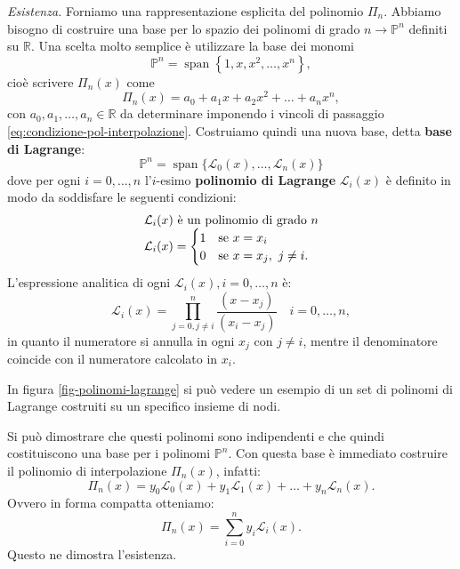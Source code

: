 \textit{Esistenza.} Forniamo una rappresentazione esplicita del polinomio $\Pi _{n}$. Abbiamo bisogno di costruire una base per lo spazio dei polinomi di grado $n\rightarrow \mathbb{P}^{n}$ definiti su $\mathbb{R}$. Una scelta molto semplice è utilizzare la base dei monomi
\begin{equation*}
\mathbb{P}^{n} =\operatorname{span}\left\{1,x,x^{2} ,\dotsc ,x^{n}\right\} ,
\end{equation*}
cioè scrivere $\Pi _{n}(x)$ come
\begin{equation*}
\Pi _{n}(x) =a_{0} +a_{1} x+a_{2} x^{2} +\dotsc +a_{n} x^{n} ,
\end{equation*}
con $a_{0} ,a_{1} ,\dotsc ,a_{n} \in \mathbb{R}$ da determinare imponendo i vincoli di passaggio \eqref{eq:condizione-pol-interpolazione}. Costruiamo quindi una nuova base, detta \textbf{base di Lagrange}:
\begin{equation*}
\mathbb{P}^{n} =\operatorname{span}\{\mathcal{L}_{0}(x) ,\dotsc ,\mathcal{L}_{n}(x)\}
\end{equation*}
dove per ogni $i=0,\dotsc ,n$ l'$i$-esimo \textbf{polinomio di Lagrange} $\mathcal{L}_{i}(x)$ è definito in modo da soddisfare le seguenti condizioni:
\begin{equation*}
\begin{array}{{>{\displaystyle}l}}
\mathcal{L}_{i}(x) \ \text{è un polinomio di grado} \ n\\
\mathcal{L}_{i}(x) =\begin{cases}
1 & \text{se} \ x=x_{i}\\
0 & \text{se} \ x=x_{j} ,\ j\neq i.
\end{cases}
\end{array}
\end{equation*}
L'espressione analitica di ogni $\mathcal{L}_{i}(x) ,i=0,\dotsc ,n$ è:
\begin{equation*}
\mathcal{L}_{i}(x) =\prod ^{n}_{j=0,j\neq i}\frac{( x-x_{j})}{( x_{i} -x_{j})} \quad i=0,\dotsc ,n,
\end{equation*}
in quanto il numeratore si annulla in ogni $x_j$ con $j\ne i$, mentre il denominatore coincide con il numeratore calcolato in $x_i$.

In figura \ref{fig-polinomi-lagrange} si può vedere un esempio di un set di polinomi di Lagrange costruiti su un specifico insieme di nodi.

Si può dimostrare che questi polinomi sono indipendenti e che quindi costituiscono una base per i polinomi $\mathbb{P}^{n}$. Con questa base è immediato costruire il polinomio di interpolazione $\Pi _{n}(x)$, infatti:
\begin{equation*}
\Pi _{n}(x) =y_{0}\mathcal{L}_{0}(x) +y_{1}\mathcal{L}_{1}(x) +\dotsc +y_{n}\mathcal{L}_{n}(x).
\end{equation*}
Ovvero in forma compatta otteniamo:
\begin{equation*}
\Pi _{n}(x) =\sum ^{n}_{i=0} y_{i}\mathcal{L}_{i}(x) .
\end{equation*}
Questo ne dimostra l'esistenza.

